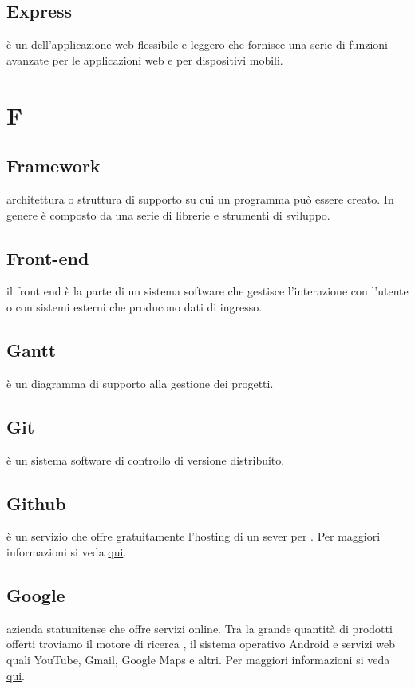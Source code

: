 \documentclass[12pt,a4paper]{article}
\begin{document}
\subsection{Express} 
è un  dell'applicazione web  flessibile e leggero che fornisce una serie di funzioni avanzate per le applicazioni web e per dispositivi mobili.


\newpage

\section{F}


\subsection{Framework} 
 architettura o struttura di supporto su cui un programma può essere creato. In genere è composto da una serie di librerie e strumenti di sviluppo.

\subsection{Front-end} 
il front end è la parte di un sistema software che gestisce l'interazione con l'utente o con sistemi esterni che producono dati di ingresso.

\newpage

\subsection{Gantt} 
 è un diagramma di supporto alla gestione dei progetti.

\subsection{Git} 
 è un sistema software di controllo di versione distribuito.

\subsection{Github} 
 è un servizio che offre gratuitamente l'hosting di un sever per . Per maggiori informazioni si veda \href{https://github.com}{qui}.

\subsection{Google} 
 azienda statunitense che offre servizi online. Tra la grande quantità di prodotti offerti troviamo il motore di ricerca , il sistema operativo Android e servizi web quali YouTube, Gmail, Google Maps e altri. Per maggiori informazioni si veda \href{https://it.wikipedia.org/wiki/Google_Inc.}{qui}.
\end{document}
